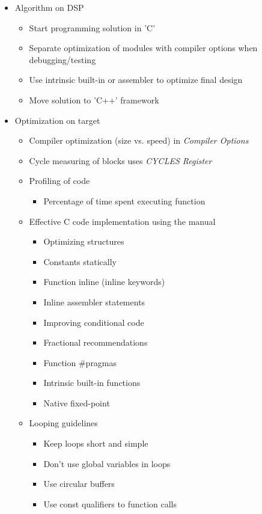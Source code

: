 \begin{itemize}
	\item Algorithm on DSP
	\begin{itemize}
		\item Start programming solution in 'C'
		\item Separate optimization of modules with compiler options when debugging/testing
		\item Use intrinsic built-in or assembler to optimize final design
		\item Move solution to 'C++' framework
	\end{itemize}
	\item Optimization on target
	\begin{itemize}
		\item Compiler optimization (size vs. speed) in \textit{Compiler Options}
		\item Cycle measuring of blocks uses \textit{CYCLES Register}
		\item Profiling of code
		\begin{itemize}
			\item Percentage of time spent executing function
		\end{itemize}
		\item Effective C code implementation using the manual
		\begin{itemize}
			\item Optimizing structures
			\item Constants statically
			\item Function inline (inline keywords)
			\item Inline assembler statements
			\item Improving conditional code
			\item Fractional recommendations
			\item Function \#pragmas
			\item Intrinsic built-in functions
			\item Native fixed-point
		\end{itemize}
		\item Looping guidelines
		\begin{itemize}
			\item Keep loops short and simple
			\item Don't use global variables in loops
			\item Use circular buffers
			\item Use const qualifiers to function calls
		\end{itemize}	
	\end{itemize}
\end{itemize}
